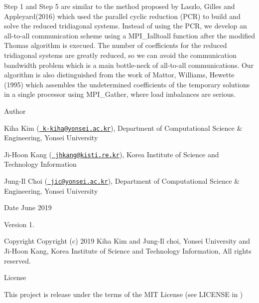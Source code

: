 Step 1 and Step 5 are similar to the method proposed by Laszlo, Gilles and Appleyard(2016) which used the parallel cyclic reduction (P\+CR) to build and solve the reduced tridiagonal systems. Instead of using the P\+CR, we develop an all-\/to-\/all communication scheme using a M\+P\+I\+\_\+\+Ialltoall function after the modified Thomas algorithm is execued. The number of coefficients for the reduced tridiagonal systems are greatly reduced, so we can avoid the communication bandwidth problem which is a main bottle-\/neck of all-\/to-\/all communications. Our algorithm is also distinguished from the work of Mattor, Williams, Hewette (1995) which assembles the undetermined coefficients of the temporary solutions in a single processor using M\+P\+I\+\_\+\+Gather, where load imbalances are serious.

\begin{DoxyAuthor}{Author}

\end{DoxyAuthor}

\begin{DoxyItemize}
\item Kiha Kim (\href{mailto:k-kiha@yonsei.ac.kr}{\texttt{ k-\/kiha@yonsei.\+ac.\+kr}}), Department of Computational Science \& Engineering, Yonsei University
\item Ji-\/\+Hoon Kang (\href{mailto:jhkang@kisti.re.kr}{\texttt{ jhkang@kisti.\+re.\+kr}}), Korea Institute of Science and Technology Information
\item Jung-\/\+Il Choi (\href{mailto:jic@yonsei.ac.kr}{\texttt{ jic@yonsei.\+ac.\+kr}}), Department of Computational Science \& Engineering, Yonsei University
\end{DoxyItemize}

\begin{DoxyDate}{Date}
June 2019 
\end{DoxyDate}
\begin{DoxyVersion}{Version}
1. 
\end{DoxyVersion}
\begin{DoxyParagraph}{Copyright}
Copyright (c) 2019 Kiha Kim and Jung-\/\+Il choi, Yonsei University and Ji-\/\+Hoon Kang, Korea Institute of Science and Technology Information, All rights reserved. 
\end{DoxyParagraph}
\begin{DoxyParagraph}{License }

\end{DoxyParagraph}
This project is release under the terms of the M\+IT License (see L\+I\+C\+E\+N\+SE in ) 
